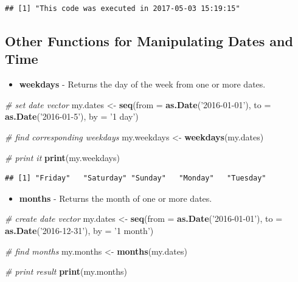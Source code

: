 \documentclass[11pt,]{book}
\newenvironment{Shaded}{\begin{snugshade}}{\end{snugshade}}
\newcommand{\KeywordTok}[1]{\textcolor[rgb]{0.27,0.27,0.27}{\textbf{#1}}}
\newcommand{\DataTypeTok}[1]{\textcolor[rgb]{0.27,0.27,0.27}{#1}}
\newcommand{\StringTok}[1]{\textcolor[rgb]{0.5,0.5,0.5}{#1}}
\newcommand{\CommentTok}[1]{\textcolor[rgb]{0.56,0.35,0.01}{\textit{#1}}}
\newcommand{\NormalTok}[1]{#1}
\providecommand{\tightlist}{%
  \setlength{\itemsep}{0pt}\setlength{\parskip}{0pt}}
\begin{document}
\begin{verbatim}
## [1] "This code was executed in 2017-05-03 15:19:15"
\end{verbatim}

\subsection{Other Functions for Manipulating Dates and
Time}\label{other-functions-for-manipulating-dates-and-time}

\begin{itemize}
\tightlist
\item
  \textbf{weekdays} - Returns the day of the week from one or more
  dates. 
\end{itemize}

\begin{Shaded}
\begin{Highlighting}[]
\CommentTok{# set date vector}
\NormalTok{my.dates <-}\StringTok{ }\KeywordTok{seq}\NormalTok{(}\DataTypeTok{from =} \KeywordTok{as.Date}\NormalTok{(}\StringTok{'2016-01-01'}\NormalTok{), }
                \DataTypeTok{to =} \KeywordTok{as.Date}\NormalTok{(}\StringTok{'2016-01-5'}\NormalTok{), }
                \DataTypeTok{by =} \StringTok{'1 day'}\NormalTok{)}

\CommentTok{# find corresponding weekdays}
\NormalTok{my.weekdays <-}\StringTok{ }\KeywordTok{weekdays}\NormalTok{(my.dates)}

\CommentTok{# print it}
\KeywordTok{print}\NormalTok{(my.weekdays)}
\end{Highlighting}
\end{Shaded}

\begin{verbatim}
## [1] "Friday"   "Saturday" "Sunday"   "Monday"   "Tuesday"
\end{verbatim}

\begin{itemize}
\tightlist
\item
  \textbf{months} - Returns the month of one or more dates.
\end{itemize}

\begin{Shaded}
\begin{Highlighting}[]
\CommentTok{# create date vector}
\NormalTok{my.dates <-}\StringTok{ }\KeywordTok{seq}\NormalTok{(}\DataTypeTok{from =} \KeywordTok{as.Date}\NormalTok{(}\StringTok{'2016-01-01'}\NormalTok{), }
                \DataTypeTok{to =} \KeywordTok{as.Date}\NormalTok{(}\StringTok{'2016-12-31'}\NormalTok{), }
                \DataTypeTok{by =} \StringTok{'1 month'}\NormalTok{)}

\CommentTok{# find months}
\NormalTok{my.months <-}\StringTok{ }\KeywordTok{months}\NormalTok{(my.dates)}

\CommentTok{# print result}
\KeywordTok{print}\NormalTok{(my.months)}
\end{Highlighting}
\end{Shaded}
\end{document}

